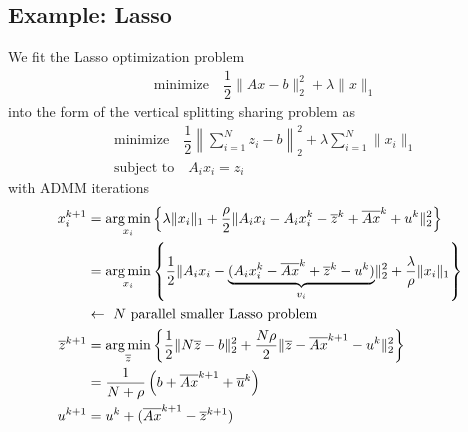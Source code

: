 \subsection{Example: Lasso}
We fit the Lasso optimization problem
\begin{align*}
    & \text{minimize} \quad \dfrac{1}{2} \lVert Ax - b \rVert_2^2 + \lambda \lVert x \rVert_1
\end{align*}
into the form of the vertical splitting sharing problem as
\begin{align*}
    & \text{minimize} \quad \dfrac{1}{2} \left\lVert \sum\limits_{i=1}^N z_i - b \right\rVert_2^2 + \lambda \sum\limits_{i=1}^N \lVert x_i \rVert_1 \\
    & \text{subject to} \quad A_ix_i = z_i
\end{align*}
with ADMM iterations
\begin{align*}
    x_i^{k+1} & = \operatorname*{arg\,min}_{x_i} \left\{ \lambda\lVert x_i \rVert_1 + \dfrac{\rho}{2} \lVert A_ix_i - A_ix_i^k - \overline{z}^k + \overline{Ax}^k + u^k \rVert_2^2 \right\} \\
    & = \operatorname*{arg\,min}_{x_i} \left\{ \dfrac{1}{2} \lVert A_ix_i - \underbrace{(A_ix_i^k - \overline{Ax}^k + \overline{z}^k - u^k)}_{v_i} \rVert_2^2 + \dfrac{\lambda}{\rho} \lVert x_i \rVert_1 \right\} \\
    & \leftarrow \text{ $N$ parallel smaller Lasso problem} \\
    \overline{z}^{k+1} & = \operatorname*{arg\,min}\limits_{\overline{z}} \left\{ \dfrac{1}{2} \lVert N\overline{z}-b \rVert_2^2 + \dfrac{N\rho}{2} \lVert \overline{z} - \overline{Ax}^{k+1} - u^k \rVert_2^2 \right\} \\
    & = \dfrac{1}{N + \rho} \left( b + \overline{Ax}^{k+1} + \overline{u}^k \right) \\
    u^{k+1} & = u^k + (\overline{Ax}^{k+1}-\overline{z}^{k+1})
\end{align*}

